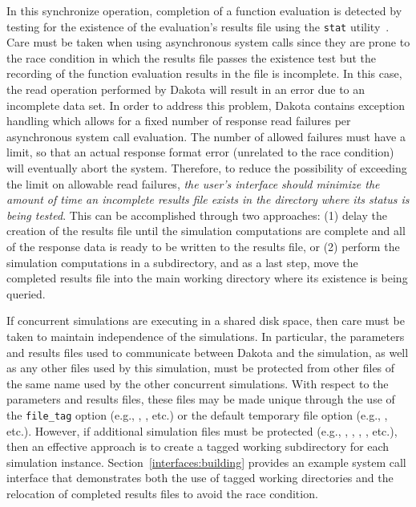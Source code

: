 In this synchronize operation, completion of a function evaluation is
detected by testing for the existence of the evaluation's results file
using the \texttt{stat} utility~\cite{Ker88}. Care must be taken when
using asynchronous system calls since they are prone to the race
condition in which the results file passes the existence test but the
recording of the function evaluation results in the file is
incomplete. In this case, the read operation performed by Dakota will
result in an error due to an incomplete data set. In order to address
this problem, Dakota contains exception handling which allows for a
fixed number of response read failures per asynchronous system call
evaluation. The number of allowed failures must have a limit, so that
an actual response format error (unrelated to the race condition) will
eventually abort the system. Therefore, to reduce the possibility of
exceeding the limit on allowable read failures, \emph{the user's
interface should minimize the amount of time an incomplete results
file exists in the directory where its status is being tested}. This
can be accomplished through two approaches: (1) delay the creation of
the results file until the simulation computations are complete and
all of the response data is ready to be written to the results file,
or (2) perform the simulation computations in a subdirectory, and as a
last step, move the completed results file into the main working
directory where its existence is being queried.

If concurrent simulations are executing in a shared disk space, then
care must be taken to maintain independence of the simulations. In
particular, the parameters and results files used to communicate
between Dakota and the simulation, as well as any other files used by
this simulation, must be protected from other files of the same name
used by the other concurrent simulations. With respect to the
parameters and results files, these files may be made unique through
the use of the \texttt{file\_tag} option (e.g., ,
, etc.) or the default temporary file
option (e.g., , etc.). However, if
additional simulation files must be protected (e.g., ,
, , , etc.), then an
effective approach is to create a tagged working subdirectory for each
simulation instance. Section~\ref{interfaces:building} provides an example
system call interface that demonstrates both the use of tagged working
directories and the relocation of completed results files to avoid the
race condition.

